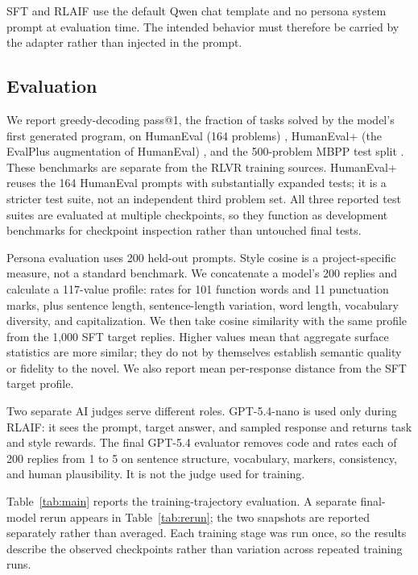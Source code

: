 \documentclass[10pt,twocolumn]{article}
\makeatletter
\newcommand{\he}{HumanEval}
\newcommand{\hep}{HumanEval+}
\newcommand{\mbpp}{MBPP}
\newcommand{\pass}{pass@1}
\makeatother
\begin{document}
SFT and RLAIF use the default Qwen chat template and no persona system prompt at
evaluation time. The intended behavior must therefore be carried by the adapter rather
than injected in the prompt.

\subsection{Evaluation}

We report greedy-decoding \pass{}, the fraction of tasks solved by the model's first
generated program, on \he{} (164 problems) \cite{chen2021codex},
\hep{} (the EvalPlus augmentation of \he{}) \cite{liu2023evalplus}, and the 500-problem
\mbpp{} test split \cite{austin2021mbpp}. These benchmarks are separate from the RLVR
training sources.
\hep{} reuses the 164 \he{} prompts with substantially expanded tests; it is a stricter
test suite, not an independent third problem set. All three reported test suites are
evaluated at multiple checkpoints, so they function
as development benchmarks for checkpoint inspection rather than untouched final tests.

Persona evaluation uses 200 held-out prompts. Style cosine is a project-specific measure,
not a standard benchmark. We concatenate a model's 200 replies and calculate a 117-value
profile: rates for 101 function words and 11 punctuation marks, plus sentence length,
sentence-length variation, word length, vocabulary diversity, and capitalization. We
then take cosine similarity with the same profile from the 1,000 SFT target replies.
Higher values mean that aggregate surface statistics are more similar; they do not by
themselves establish semantic quality or fidelity to the novel. We also report mean
per-response distance from the SFT target profile.

Two separate AI judges serve different roles. GPT-5.4-nano is used only during RLAIF:
it sees the prompt, target answer, and sampled response and returns task and style
rewards. The final GPT-5.4 evaluator removes code and rates each of 200 replies from 1
to 5 on sentence structure, vocabulary, markers, consistency, and human plausibility.
It is not the judge used for training.

Table~\ref{tab:main} reports the training-trajectory evaluation. A separate final-model
rerun appears in Table~\ref{tab:rerun}; the two snapshots are reported separately rather
than averaged. Each training stage was run once, so the results describe the observed
checkpoints rather than variation across repeated training runs.
\end{document}
